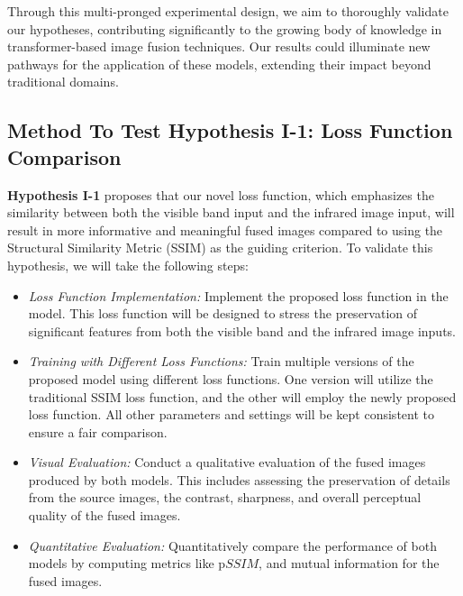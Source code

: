 Through this multi-pronged experimental design, we aim to thoroughly validate our hypotheses, contributing significantly to the growing body of knowledge in transformer-based image fusion techniques. Our results could illuminate new pathways for the application of these models, extending their impact beyond traditional domains.

\subsection{Method To Test Hypothesis I-1: Loss Function Comparison} \label{subsec:met2}


\textbf{Hypothesis I-1} proposes that our novel loss function, which emphasizes the similarity between both the visible band input and the infrared image input, will result in more informative and meaningful fused images compared to using the Structural Similarity Metric (SSIM) as the guiding criterion. To validate this hypothesis, we will take the following steps:

\begin{itemize}

    \item \textit{Loss Function Implementation:} Implement the proposed loss function in the model. This loss function will be designed to stress the preservation of significant features from both the visible band and the infrared image inputs.

    \item \textit{Training with Different Loss Functions:} Train multiple versions of the proposed model using different loss functions. One version will utilize the traditional SSIM loss function, and the other will employ the newly proposed loss function. All other parameters and settings will be kept consistent to ensure a fair comparison.

    \item \textit{Visual Evaluation:} Conduct a qualitative evaluation of the fused images produced by both models. This includes assessing the preservation of details from the source images, the contrast, sharpness, and overall perceptual quality of the fused images.

    \item \textit{Quantitative Evaluation:} Quantitatively compare the performance of both models by computing metrics like p$SSIM$, and mutual information for the fused images.

\end{itemize}

